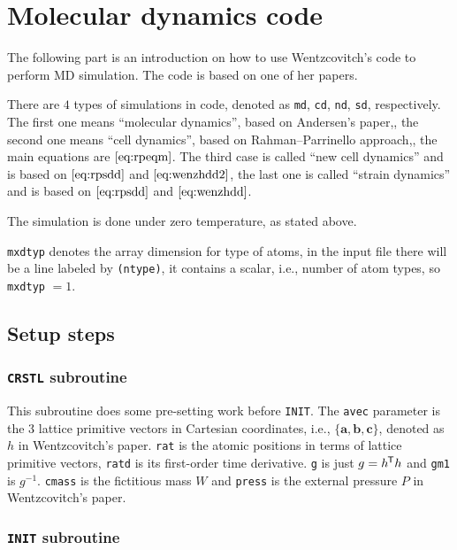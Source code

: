 
\section{Molecular dynamics code}

The following part is an introduction on how to use
Wentzcovitch's code to perform MD simulation. The code is
based on one of her papers.\cite{Wentzcovitch:1991ka}

There are $4$ types of simulations in code,
denoted as \texttt{md}, \texttt{cd}, \texttt{nd}, \texttt{sd},
respectively. The first one means ``molecular dynamics'',
based on Andersen's paper,\cite{Andersen:1980ew},
the second one means ``cell dynamics'', based on
Rahman–Parrinello approach,\cite{Parrinello:1980kx},
the main equations are $\eqref{eq:rpeqm}$.
The third case is called ``new cell dynamics'' and is based on
$\eqref{eq:rpsdd}$ and $\eqref{eq:wenzhdd2}$,
the last one is called ``strain dynamics'' and is based on
$\eqref{eq:rpsdd}$ and $\eqref{eq:wenzhdd}$.

The simulation is done under zero temperature, as stated above.

\texttt{mxdtyp} denotes the array dimension for type of atoms,
in the input file there will be a line labeled by \texttt{(ntype)}, it
contains a scalar, i.e., number of atom types, so \texttt{mxdtyp} $=1$.

\subsection{Setup steps}

\subsubsection{\texttt{CRSTL} subroutine}

This subroutine does some pre-setting work before \texttt{INIT}.
The \texttt{avec} parameter is the $3$ lattice primitive vectors in Cartesian
coordinates,
i.e., $\{ \bm{a}, \bm{b}, \bm{c} \}$,
denoted as $h$ in Wentzcovitch's paper.\cite{Wentzcovitch:1991ka}
\texttt{rat} is the atomic positions in terms of lattice primitive vectors,
\texttt{ratd} is its first-order time derivative.
\texttt{g} is just $g = h ^{\mkern-1.5mu\mathsf{T}} h$ and \texttt{gm1} is $g^{-1}$.
\texttt{cmass} is the fictitious mass $W$ and
\texttt{press} is the external pressure $P​$ in
Wentzcovitch's paper.\cite{Wentzcovitch:1991ka}


\subsubsection{\texttt{INIT} subroutine}

